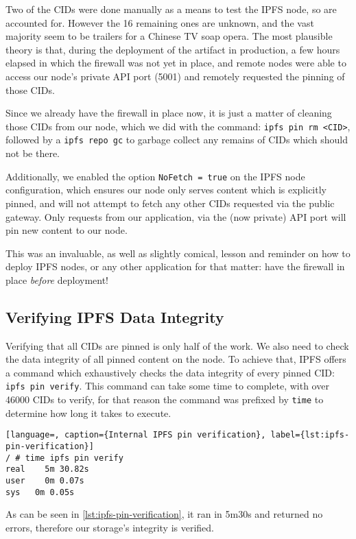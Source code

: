 Two of the CIDs were done manually as a means to test the IPFS node, so are accounted for. However the 16 remaining ones are unknown, and the vast majority seem to be trailers for a Chinese TV soap opera.
The most plausible theory is that, during the deployment of the artifact in production, a few hours elapsed in which the firewall was not yet in place, and remote nodes were able to access our node's private API port (5001) and remotely requested the pinning of those CIDs.

Since we already have the firewall in place now, it is just a matter of cleaning those CIDs from our node, which we did with the command: \texttt{ipfs pin rm <CID>}, followed by a \texttt{ipfs repo gc} to garbage collect any remains of CIDs which should not be there.

Additionally, we enabled the option \texttt{NoFetch = true} on the IPFS node configuration, which ensures our node only serves content which is explicitly pinned, and will not attempt to fetch any other CIDs requested via the public gateway. Only requests from our application, via the (now private) API port will pin new content to our node.

This was an invaluable, as well as slightly comical, lesson and reminder on how to deploy IPFS nodes, or any other application for that matter: have the firewall in place \emph{before} deployment!

\subsection{Verifying IPFS Data Integrity}

Verifying that all CIDs are pinned is only half of the work. We also need to check the data integrity of all pinned content on the node. To achieve that, IPFS offers a command which exhaustively checks the data integrity of every pinned CID: \texttt{ipfs pin verify}. This command can take some time to complete, with over 46000 CIDs to verify, for that reason the command was prefixed by \texttt{time} to determine how long it takes to execute.

\begin{lstlisting}[language=, caption={Internal IPFS pin verification}, label={lst:ipfs-pin-verification}] 
/ # time ipfs pin verify
real	5m 30.82s
user	0m 0.07s
sys	  0m 0.05s
\end{lstlisting}

As can be seen in \autoref{lst:ipfs-pin-verification}, it ran in 5m30s and returned no errors, therefore our storage's integrity is verified.


